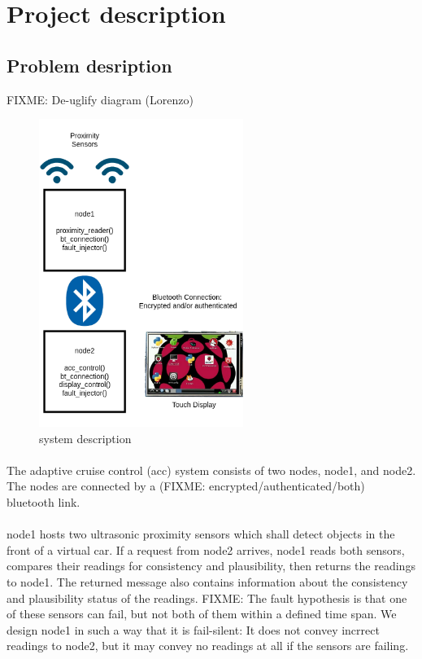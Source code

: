 \section{Project description}
\label{chapter1}

\subsection{Problem desription}

FIXME: De-uglify diagram (Lorenzo)

\begin{figure}[h]
	\includegraphics[height=100mm]{images/system}
	\centering
	\caption{system description}
	\label{fig:system}
\end{figure}

\paragraph{}
The adaptive cruise control (acc) system consists of two nodes, node1, and node2. The nodes are connected
by a (FIXME: encrypted/authenticated/both) bluetooth link.

\paragraph{}
node1 hosts two ultrasonic proximity sensors which shall detect objects in the front of a virtual car. If
a request from node2 arrives, node1 reads both sensors, compares their readings for consistency and plausibility,
then returns the readings to node1. The returned message also contains information about the consistency and
plausibility status of the readings.
FIXME: The fault hypothesis is that one of these sensors can fail, but not both of them within a defined
time span. We design node1 in such a way that it is fail-silent: It does not convey incrrect readings to node2,
but it may convey no readings at all if the sensors are failing.

